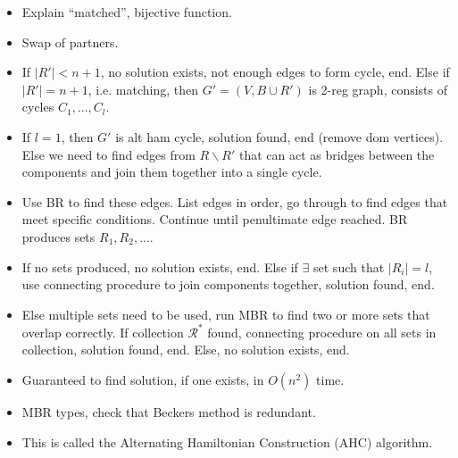 \documentclass{elsarticle}
\begin{document}
\begin{itemize}
	\item Explain ``matched'', bijective function.
	\item Swap of partners.
	\item If $|R'| < n+1$, no solution exists, not enough edges to form cycle, end. Else if $|R'| = n+1$, i.e. matching, then $G' = (V, B \cup R')$ is 2-reg graph, consists of cycles $C_1,...,C_l$.
	\item If $l = 1$, then $G'$ is alt ham cycle, solution found, end (remove dom vertices). Else we need to find edges from $R\backslash R'$ that can act as bridges between the components and join them together into a single cycle. 
	\item Use BR to find these edges. List edges in order, go through to find edges that meet specific conditions. Continue until penultimate edge reached. BR produces sets $R_1, R_2,...$.
	\item If no sets produced, no solution exists, end. Else if $\exists$ set such that $|R_i| = l$, use connecting procedure to join components together, solution found, end.
	\item Else multiple sets need to be used, run MBR to find two or more sets that overlap correctly. If collection $\mathcal{R}^*$ found, connecting procedure on all sets in collection, solution found, end. Else, no solution exists, end.
	\item Guaranteed to find solution, if one exists, in $O(n^2)$ time.
	\item MBR types, check that Beckers method is redundant.
	\item This is called the Alternating Hamiltonian Construction (AHC) algorithm.
\end{itemize}
\end{document}
